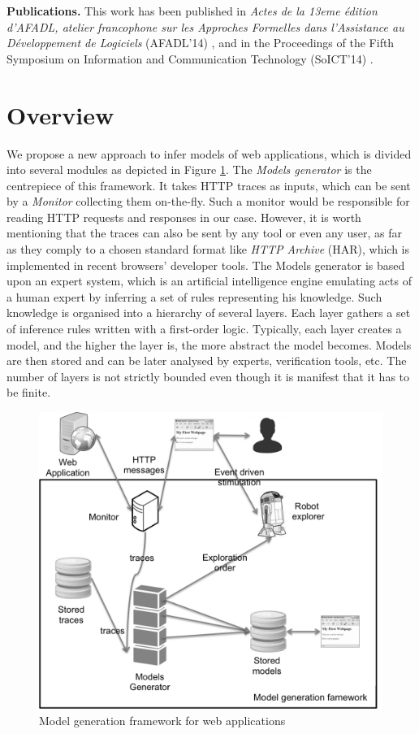\textbf{Publications.} This work has been published in
\textit{Actes de la 13eme {\'e}dition d’AFADL, atelier
francophone sur les Approches Formelles dans l’Assistance au
D{\'e}veloppement de Logiciels} (AFADL'14)
\cite{durand2014inference}, and in the Proceedings of the Fifth
Symposium on Information and Communication Technology (SoICT'14)
\cite{DBLP:conf/soict/DurandS14}.


\section{Overview}

We propose a new approach to infer models of web applications,
which is divided into several modules as depicted in Figure
\ref{fig:soict-framework}. The \textit{Models generator} is the
centrepiece of this framework. It takes HTTP traces as inputs,
which can be sent by a \textit{Monitor} collecting them on-the-fly.
Such a monitor would be responsible for reading HTTP requests and
responses in our case. However, it is worth mentioning that the
traces can also be sent by any tool or even any user, as far as
they comply to a chosen standard format like \textit{HTTP
Archive} (HAR), which is implemented in recent browsers'
developer tools. The Models generator is based upon an expert
system, which is an artificial intelligence engine emulating acts
of a human expert by inferring a set of rules representing his
knowledge.  Such knowledge is organised into a hierarchy of
several layers.  Each layer gathers a set of inference rules
written with a first-order logic. Typically, each layer creates a
model, and the higher the layer is, the more abstract the model
becomes. Models are then stored and can be later analysed by
experts, verification tools, etc. The number of layers is not
strictly bounded even though it is manifest that it has to be
finite.

\begin{figure}[ht]
    \begin{center}
        \includegraphics[width=0.8\linewidth]{figures/soict-framework.png}
    \end{center}
    \caption{Model generation framework for web applications}

    \label{fig:soict-framework}
\end{figure}

